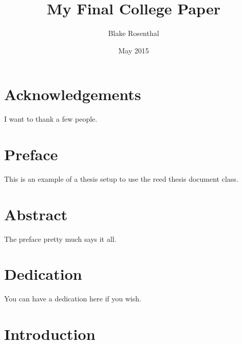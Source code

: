 \documentclass[12pt,twoside]{reedthesis}
\title{My Final College Paper}
\author{Blake Rosenthal}
\date{May 2015}
\begin{document}
  \maketitle
  \frontmatter %
  \pagestyle{empty} %

    \chapter*{Acknowledgements}
	I want to thank a few people.

    \chapter*{Preface}
	This is an example of a thesis setup to use the reed thesis document class.

    \tableofcontents
    \listoftables
    \listoffigures

    \chapter*{Abstract}
	The preface pretty much says it all.
	
	\chapter*{Dedication}
	You can have a dedication here if you wish.

  \mainmatter %
  \pagestyle{fancyplain} %


    \chapter*{Introduction}
\end{document}
